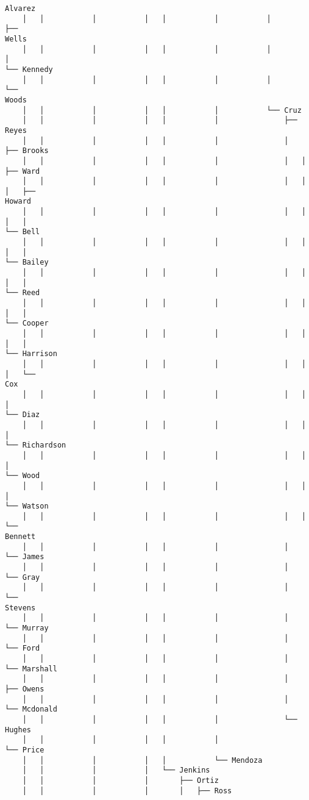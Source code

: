 \documentclass[11pt]{article}
\begin{document}
\begin{Verbatim}[commandchars=\\\{\}]
Alvarez
    │   │           │           │   │           │           │               ├──
Wells
    │   │           │           │   │           │           │               │
└── Kennedy
    │   │           │           │   │           │           │               └──
Woods
    │   │           │           │   │           │           └── Cruz
    │   │           │           │   │           │               ├── Reyes
    │   │           │           │   │           │               │   ├── Brooks
    │   │           │           │   │           │               │   │   ├── Ward
    │   │           │           │   │           │               │   │   │   ├──
Howard
    │   │           │           │   │           │               │   │   │   │
└── Bell
    │   │           │           │   │           │               │   │   │   │
└── Bailey
    │   │           │           │   │           │               │   │   │   │
└── Reed
    │   │           │           │   │           │               │   │   │   │
└── Cooper
    │   │           │           │   │           │               │   │   │   │
└── Harrison
    │   │           │           │   │           │               │   │   │   └──
Cox
    │   │           │           │   │           │               │   │   │
└── Diaz
    │   │           │           │   │           │               │   │   │
└── Richardson
    │   │           │           │   │           │               │   │   │
└── Wood
    │   │           │           │   │           │               │   │   │
└── Watson
    │   │           │           │   │           │               │   │   └──
Bennett
    │   │           │           │   │           │               │   └── James
    │   │           │           │   │           │               │       └── Gray
    │   │           │           │   │           │               │           └──
Stevens
    │   │           │           │   │           │               │
└── Murray
    │   │           │           │   │           │               │
└── Ford
    │   │           │           │   │           │               │
└── Marshall
    │   │           │           │   │           │               │
├── Owens
    │   │           │           │   │           │               │
└── Mcdonald
    │   │           │           │   │           │               └── Hughes
    │   │           │           │   │           │                   └── Price
    │   │           │           │   │           └── Mendoza
    │   │           │           │   └── Jenkins
    │   │           │           │       ├── Ortiz
    │   │           │           │       │   ├── Ross

\end{Verbatim}
\end{document}
